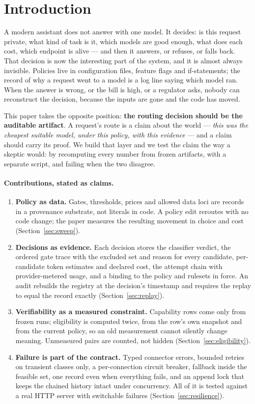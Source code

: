 \documentclass[11pt]{article}
\begin{document}
\section{Introduction}

A modern assistant does not answer with one model. It decides: is this request private, what
kind of task is it, which models are good enough, what does each cost, which endpoint is alive
--- and then it answers, or refuses, or falls back. That decision is now the interesting part of
the system, and it is almost always invisible. Policies live in configuration files, feature
flags and if-statements; the record of why a request went to a model is a log line saying which
model ran. When the answer is wrong, or the bill is high, or a regulator asks, nobody can
reconstruct the decision, because the inputs are gone and the code has moved.

This paper takes the opposite position: \textbf{the routing decision should be the auditable
artifact}. A request's route is a claim about the world --- \emph{this was the cheapest suitable
model, under this policy, with this evidence} --- and a claim should carry its proof. We build
that layer and we test the claim the way a skeptic would: by recomputing every number from
frozen artifacts, with a separate script, and failing when the two disagree.

\paragraph{Contributions, stated as claims.}
\begin{enumerate}
\item \textbf{Policy as data.} Gates, thresholds, prices and allowed data loci are records in a
provenance substrate, not literals in code. A policy edit reroutes with no code change; the
paper measures the resulting movement in choice and cost (Section~\ref{sec:sweep}).
\item \textbf{Decisions as evidence.} Each decision stores the classifier verdict, the ordered
gate trace with the excluded set and reason for every candidate, per-candidate token estimates
and declared cost, the attempt chain with provider-metered usage, and a binding to the policy
and rulesets in force. An audit rebuilds the registry at the decision's timestamp and requires
the replay to equal the record exactly (Section~\ref{sec:replay}).
\item \textbf{Verifiability as a measured constraint.} Capability rows come only from frozen
runs; eligibility is computed twice, from the row's own snapshot and from the current policy, so
an old measurement cannot silently change meaning. Unmeasured pairs are counted, not hidden
(Section~\ref{sec:eligibility}).
\item \textbf{Failure is part of the contract.} Typed connector errors, bounded retries on
transient classes only, a per-connection circuit breaker, fallback inside the feasible set, one
record even when everything fails, and an append lock that keeps the chained history intact
under concurrency. All of it is tested against a real HTTP server with switchable failures
(Section~\ref{sec:resilience}).
\end{enumerate}
\end{document}
